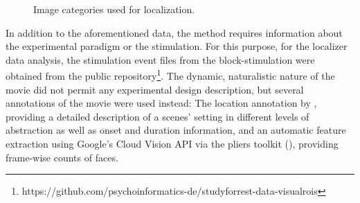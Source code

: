 \documentclass[a4paper, 12pt]{scrreprt}
\begin{document}
\begin{figure}[H]
	\caption{\small{Image categories used for localization.}}
	\label{fig:stims}
\end{figure} 

In addition to the aforementioned data, the method requires information about the experimental paradigm or the stimulation. For this purpose, for the localizer data analysis, the stimulation event files from the block-stimulation were obtained from the public repository\footnote{https://github.com/psychoinformatics-de/studyforrest-data-visualrois}. The dynamic, naturalistic nature of the movie did not permit any experimental design description, but several annotations of the movie were used instead: The location annotation by \textcite{hausler2016annotation}, providing a detailed description of a scenes' setting in different levels of abstraction as well as onset and duration information, and an automatic feature extraction using Google's Cloud Vision API via the pliers toolkit (\cite{yarkonipliers}), providing frame-wise counts of faces. 
\end{document}
